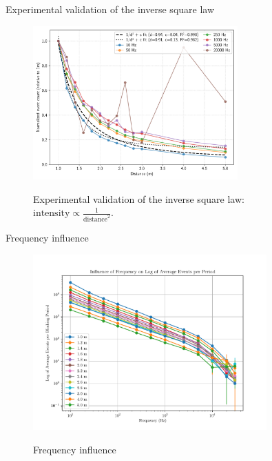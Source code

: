 \documentclass{beamer}
\begin{document}
\begin{frame}{Experimental validation of the inverse square law}

    \begin{figure}
        \centering
        \includegraphics[width=0.70\textwidth]{../fig/pgfplot/build/inv_square.pdf}
        \label{fig:fit1}
        \caption{Experimental validation of the inverse square law: \scriptsize{$\text{intensity} \propto \frac{1}{\text{distance}^2}$}.}
    \end{figure}


\end{frame}

\begin{frame}{Frequency influence}

\begin{figure}[H]
    \centering
    \includegraphics[width=0.8\textwidth]{../fig/semestral/freqlog.pdf}
    \label{fig:freq_influence}
    \caption{Frequency influence}
\end{figure}

\end{frame}
\end{document}
